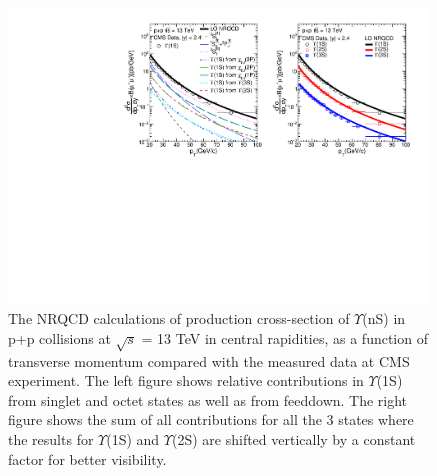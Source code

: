\begin{figure}
  \centering
  \includegraphics[width=0.99\textwidth]{Figures/NRQCD_Beauty/Fig_CMS_YnS_Rap12_13TeV_Pt.pdf}
  \caption{\small{The NRQCD calculations of production cross-section of $\Upsilon$(nS)
      in p+p collisions at $\sqrt{s}$ = 13 TeV in central rapidities, as a function of
      transverse momentum compared with the measured data at CMS~\cite{Sirunyan:2017qdw}
      experiment. The left figure shows relative contributions in $\Upsilon$(1S) from
      singlet and octet states as well as from feeddown. The right figure shows the sum
      of all contributions for all the 3 states where the results for $\Upsilon$(1S) and
      $\Upsilon$(2S) are shifted vertically by a constant factor for better visibility. } }
  \label{Fig:SigmaYnSCMS13TeV}
\end{figure}



